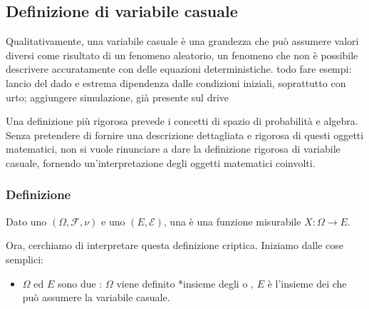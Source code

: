 \documentclass[letterpaper,10pt,italian]{jupyterBook}
\begin{document}
\sphinxstepscope


\subsection{Definizione di variabile casuale}
\label{\detokenize{ch/statistics/random_variables_definition:definizione-di-variabile-casuale}}\label{\detokenize{ch/statistics/random_variables_definition:statistics-hs-random-variables-def}}\label{\detokenize{ch/statistics/random_variables_definition::doc}}
\sphinxAtStartPar
Qualitativamente, una variabile casuale è una grandezza che può assumere valori diversi come risultato di un fenomeno aleatorio, un fenomeno che non è possibile descrivere accuratamente con delle equazioni deterministiche. todo fare esempi: lancio del dado e estrema dipendenza dalle condizioni iniziali, soprattutto con urto; aggiungere simulazione, già presente sul drive

\sphinxAtStartPar
Una definizione più rigorosa prevede i concetti di spazio di probabilità e
\sphinxhyphen{}algebra. Senza pretendere di fornire una descrizione dettagliata e rigorosa di questi oggetti matematici, non si vuole rinunciare a dare la definizione rigorosa di variabile casuale, fornendo un’interpretazione degli oggetti matematici coinvolti.


\subsubsection{Definizione}
\label{\detokenize{ch/statistics/random_variables_definition:definizione}}
\sphinxAtStartPar
Dato uno  \((\Omega, \mathcal{F}, \nu)\) e uno  \((E, \mathcal{E})\), una  è una funzione misurabile \(X: \Omega \rightarrow E\).

\sphinxAtStartPar
Ora, cerchiamo di interpretare questa definizione criptica. Iniziamo dalle cose semplici:
\begin{itemize}
\item {} 
\sphinxAtStartPar
\(\Omega\) ed \(E\) sono due : \(\Omega\) viene definito *insieme degli  o , \(E\) è l’insieme dei  che può assumere la variabile casuale.

\end{itemize}
\end{document}

